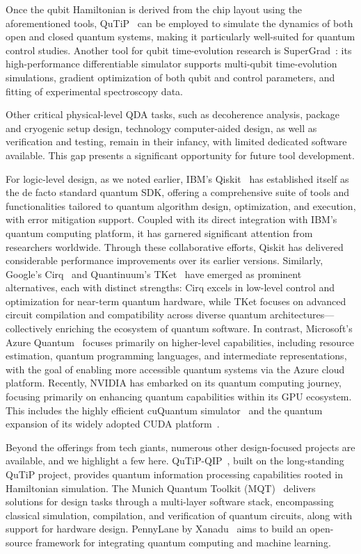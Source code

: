 \documentclass[a4paper,onecolumn,11pt,unpublished]{quantumarticle}
\begin{document}
Once the qubit Hamiltonian is derived from the chip layout using the aforementioned tools, QuTiP~\cite{Johansson2012QuTiP,Johansson2013QuTiP} can be employed to simulate the dynamics of both open and closed quantum systems, making it particularly well-suited for quantum control studies. Another tool for qubit time-evolution research is SuperGrad~\cite{Wang2025SuperGrad}: its high-performance differentiable simulator supports multi-qubit time-evolution simulations, gradient optimization of both qubit and control parameters, and fitting of experimental spectroscopy data. 

Other critical physical-level QDA tasks, such as decoherence analysis, package and cryogenic setup design, technology computer-aided design, as well as verification and testing, remain in their infancy, with limited dedicated software available. This gap presents a significant opportunity for future tool development.

For logic-level design, as we noted earlier, IBM's Qiskit~\cite{JavadiAbhari2024Quantum} has established itself as the de facto standard quantum SDK, offering a comprehensive suite of tools and functionalities tailored to quantum algorithm design, optimization, and execution, with error mitigation support. Coupled with its direct integration with IBM's quantum computing platform, it has garnered significant attention from researchers worldwide. Through these collaborative efforts, Qiskit has delivered considerable performance improvements over its earlier versions. Similarly, Google's Cirq~\cite{Developers2024Cirq} and Quantinuum's TKet~\cite{sivarajah2020t} have emerged as prominent alternatives, each with distinct strengths: Cirq excels in low-level control and optimization for near-term quantum hardware, while TKet focuses on advanced circuit compilation and compatibility across diverse quantum architectures---collectively enriching the ecosystem of quantum software. In contrast, Microsoft's Azure Quantum~\cite{Svore_2018} focuses primarily on higher-level capabilities, including resource estimation, quantum programming languages, and intermediate representations, with the goal of enabling more accessible quantum systems via the Azure cloud platform. Recently, NVIDIA has embarked on its quantum computing journey, focusing primarily on enhancing quantum capabilities within its GPU ecosystem. This includes the highly efficient cuQuantum simulator~\cite{cuquantum_sdk_2024} and the quantum expansion of its widely adopted CUDA platform~\cite{CUDA-Q}. 

Beyond the offerings from tech giants, numerous other design-focused projects are available, and we highlight a few here. QuTiP-QIP~\cite{Lambert2024QuTiP}, built on the long-standing QuTiP project, provides quantum information processing capabilities rooted in Hamiltonian simulation. The Munich Quantum Toolkit (MQT)~\cite{Wille2024The} delivers solutions for design tasks through a multi-layer software stack, encompassing classical simulation, compilation, and verification of quantum circuits, along with support for hardware design. PennyLane by Xanadu~\cite{bergholmPennyLaneAutomaticDifferentiation2022} aims to build an open-source framework for integrating quantum computing and machine learning.
\end{document}
